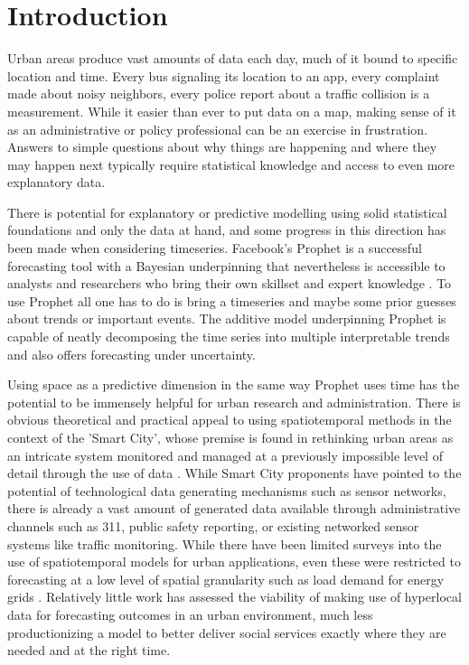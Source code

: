 
\chapter{Introduction}
\label{introduction}

Urban areas produce vast amounts of data each day, much of it bound to specific location and time. Every bus signaling its location to an app, every complaint made about noisy neighbors, every police report about a traffic collision is a measurement. While it easier than ever to put data on a map, making sense of it as an administrative or policy professional can be an exercise in frustration. Answers to simple questions about why things are happening and where they may happen next typically require statistical knowledge and access to even more explanatory data. \par

There is potential for explanatory or predictive modelling using solid statistical foundations and only the data at hand, and some progress in this direction has been made when considering timeseries. Facebook's Prophet is a successful forecasting tool with a Bayesian underpinning that nevertheless is accessible to analysts and researchers who bring their own skillset and expert knowledge \cite{prophet}. To use Prophet all one has to do is bring a timeseries and maybe some prior guesses about trends or important events. The additive model underpinning Prophet is capable of neatly decomposing the time series into multiple interpretable trends and also offers forecasting under uncertainty.

Using space as a predictive dimension in the same way Prophet uses time has the potential to be immensely helpful for urban research and administration. There is obvious theoretical and practical appeal to using spatiotemporal methods in the context of the 'Smart City', whose premise is found in rethinking urban areas as an intricate system monitored and managed at a previously impossible level of detail through the use of data \cite{kitchin_2014}. While Smart City proponents have pointed to the potential of technological data generating mechanisms such as sensor networks, there is already a vast amount of generated data available through administrative channels such as 311, public safety reporting, or existing networked sensor systems like traffic monitoring. While there have been limited surveys into the use of spatiotemporal models for urban applications, even these were restricted to forecasting at a low level of spatial granularity such as load demand for energy grids \cite{tascikaraoglu_2017}. Relatively little work has assessed the viability of making use of hyperlocal data for forecasting outcomes in an urban environment, much less productionizing a model to better deliver social services exactly where they are needed and at the right time.
